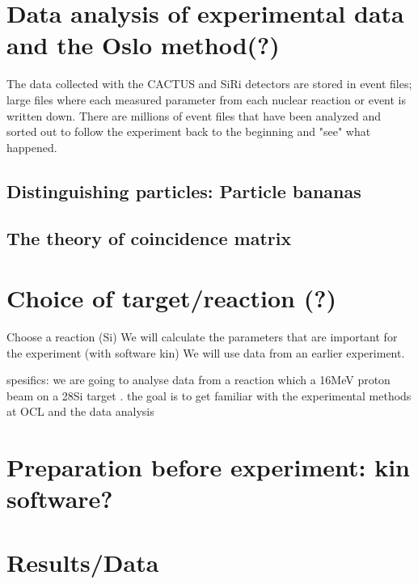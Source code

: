 \documentclass[11pt,a4wide]{article}
\begin{document}
\section{Data analysis of experimental data and the Oslo method(?)}
The data collected with the CACTUS and SiRi detectors are stored in event files; large files where each measured parameter from each nuclear reaction or event is written down. There are millions of event files that have been analyzed and sorted out to follow the experiment back to the beginning and "see" what happened.

\subsection{Distinguishing particles: Particle bananas}

\subsection{The theory of coincidence matrix}

\section{Choice of target/reaction (?)}

Choose a reaction (Si)
We will calculate the parameters that are important for the experiment (with software kin)
We will use data from an earlier experiment.


spesifics:
we are going to analyse data from a reaction which a 16MeV proton beam on a 28Si target . the goal is to get familiar with the experimental methods at OCL and the data analysis



\section{Preparation before experiment: kin software?}

\section{Results/Data}
\end{document}
